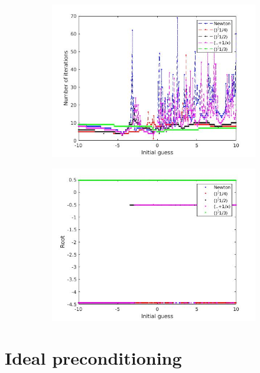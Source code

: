 \documentclass{book}
\begin{document}
\begin{figure}
	\begin{subfigure}{0.5\textwidth}
		\includegraphics[width=\textwidth]{exp3_01.jpg}
	\end{subfigure}
	\begin{subfigure}{0.5\textwidth}
		\includegraphics[width=\textwidth]{exp3_02.jpg}
	\end{subfigure}
\end{figure}

\section{Ideal preconditioning}
\end{document}
